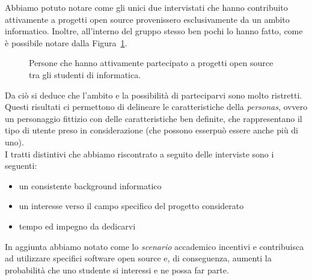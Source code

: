 \documentclass[12pt]{article} %
\begin{document}
Abbiamo potuto notare come gli unici due intervistati che hanno contribuito attivamente a progetti open source provenissero esclusivamente da un ambito informatico. Inoltre, all'interno del gruppo stesso ben pochi lo hanno fatto, come \`e possibile notare dalla Figura~\ref{fig:distribuzioneInformatica}.

\begin{figure}[H]
\caption{Persone che hanno attivamente partecipato a progetti open source tra gli studenti di informatica.}
\label{fig:distribuzioneInformatica}
\end{figure}

Da ci\`o si deduce che l'ambito e la possibilit\`a di parteciparvi sono molto ristretti. Questi risultati ci permettono di delineare le caratteristiche della \emph{personas}, ovvero un personaggio fittizio con delle caratteristiche ben definite, che rappresentano il tipo di utente preso in considerazione (che possono esserpu\`o essere anche pi\`u di uno).\\
I tratti distintivi che abbiamo riscontrato a seguito delle interviste sono i seguenti:
\begin{itemize}
\item un consistente background informatico
\item un interesse verso il campo specifico del progetto considerato
\item tempo ed impegno da dedicarvi
\end{itemize}

In aggiunta abbiamo notato come lo \emph{scenario} accademico incentivi e contribuisca ad utilizzare specifici software open source e, di conseguenza, aumenti la probabilit\`a che uno studente si interessi e ne possa far parte.
\end{document}
